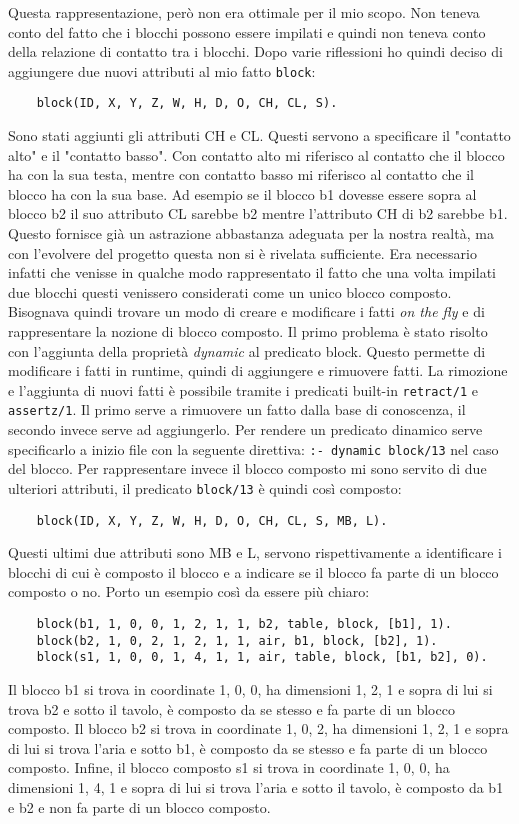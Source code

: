 Questa rappresentazione, però non era ottimale per il mio scopo. Non teneva conto del fatto che i blocchi possono essere impilati e quindi non teneva conto della relazione di contatto tra i blocchi. Dopo varie riflessioni ho quindi deciso di aggiungere due nuovi attributi al mio fatto \verb+block+:
\begin{verbatim}
    block(ID, X, Y, Z, W, H, D, O, CH, CL, S).
\end{verbatim}
Sono stati aggiunti gli attributi CH e CL. Questi servono a specificare il "contatto alto" e il "contatto basso". Con contatto alto mi riferisco al contatto che il blocco ha con la sua testa, mentre con contatto basso mi riferisco al contatto che il blocco ha con la sua base. Ad esempio se il blocco b1 dovesse essere sopra al blocco b2 il suo attributo CL sarebbe b2 mentre l'attributo CH di b2 sarebbe b1. Questo fornisce già un astrazione abbastanza adeguata per la nostra realtà, ma con l'evolvere del progetto questa non si è rivelata sufficiente.
Era necessario infatti che venisse in qualche modo rappresentato il fatto che una volta impilati due blocchi questi venissero considerati come un unico blocco composto. Bisognava quindi trovare un modo di creare e modificare i fatti \textit{on the fly} e di rappresentare la nozione di blocco composto.
Il primo problema è stato risolto con l'aggiunta della proprietà \textit{dynamic} al predicato block. Questo permette di modificare i fatti in runtime, quindi di aggiungere e rimuovere fatti. La rimozione e l'aggiunta di nuovi fatti è possibile tramite i predicati built-in \verb+retract/1+ e \verb+assertz/1+. Il primo serve a rimuovere un fatto dalla base di conoscenza, il secondo invece serve ad aggiungerlo.
Per rendere un predicato dinamico serve specificarlo a inizio file con la seguente direttiva: \verb+:- dynamic block/13+ nel caso del blocco.
Per rappresentare invece il blocco composto mi sono servito di due ulteriori attributi, il predicato \verb+block/13+ è quindi così composto:
\begin{verbatim}
    block(ID, X, Y, Z, W, H, D, O, CH, CL, S, MB, L).
\end{verbatim}
Questi ultimi due attributi sono MB e L, servono rispettivamente a identificare i blocchi di cui è composto il blocco e a indicare se il blocco fa parte di un blocco composto o no. Porto un esempio così da essere più chiaro:
\begin{verbatim}
    block(b1, 1, 0, 0, 1, 2, 1, 1, b2, table, block, [b1], 1).
    block(b2, 1, 0, 2, 1, 2, 1, 1, air, b1, block, [b2], 1).
    block(s1, 1, 0, 0, 1, 4, 1, 1, air, table, block, [b1, b2], 0).
\end{verbatim}
Il blocco b1 si trova in coordinate 1, 0, 0, ha dimensioni 1, 2, 1 e sopra di lui si trova b2 e sotto il tavolo, è composto da se stesso e fa parte di un blocco composto.
Il blocco b2 si trova in coordinate 1, 0, 2, ha dimensioni 1, 2, 1 e sopra di lui si trova l'aria e sotto b1, è composto da se stesso e fa parte di un blocco composto.
Infine, il blocco composto s1 si trova in coordinate 1, 0, 0, ha dimensioni 1, 4, 1 e sopra di lui si trova l'aria e sotto il tavolo, è composto da b1 e b2 e non fa parte di un blocco composto.

